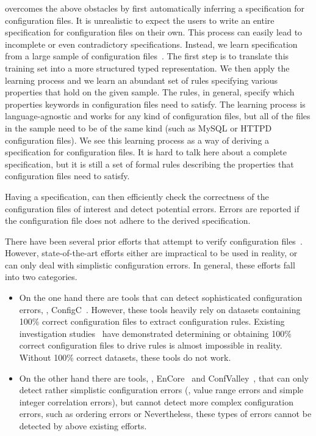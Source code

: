 \app overcomes the above obstacles by first automatically inferring a
specification for configuration files. It is unrealistic to expect the 
users to write an entire specification for configuration files on their own. 
This process can easily lead to incomplete or even contradictory 
specifications. Instead, we learn specification from 
a large sample of 
configuration files~\cite{configdataset}. The first step is to 
translate this training set into a more structured typed representation.
We then apply the learning process and we learn an abundant set of rules 
specifying various properties that hold on the given sample. The rules, in general, 
specify which properties keywords in configuration files need to satisfy.
The learning process is language-agnostic and works for any kind 
of configuration files,  but all of the files in the sample need to be of 
the same kind (such as MySQL or HTTPD configuration files).
We see this learning process as 
a way of deriving  a specification for configuration files. 
It is hard to talk here about a complete specification, but it is still
a set of formal rules describing the properties that configuration files need to satisfy. 

Having a specification, \app can then efficiently check 
the correctness of the configuration files of interest and detect 
potential errors. Errors are reported if the configuration file does not 
adhere to the derived specification.

There have been several prior efforts that attempt to verify 
configuration files~\cite{santolucitoCAV, xu16early,
zhang14encore, huang15confvalley}.
However, state-of-the-art efforts either are impractical to be used
in reality, or can only deal with simplistic configuration errors.
In general, these efforts fall into two categories.\begin{itemize}
\item On the one hand there are tools that can detect sophisticated 
configuration errors, \eg, ConfigC~\cite{santolucitoCAV}. 
However, these tools heavily rely on datasets containing 100\% 
correct configuration files to extract configuration rules.
Existing investigation studies~\cite{wang04automatic, yin11anempirical}
have demonstrated determining or obtaining 100\% correct configuration
files to drive rules is almost impossible in reality. 
Without 100\% correct datasets, these tools do not work.
\item On the other hand there are tools, 
\eg, EnCore~\cite{zhang14encore} and
ConfValley~\cite{huang15confvalley}, that can only 
detect rather simplistic configuration errors (\eg, value range errors 
and simple integer correlation errors), but cannot detect
more complex configuration errors, such as ordering errors or 
Nevertheless, these types of errors cannot be detected by above existing
efforts.
\end{itemize}

